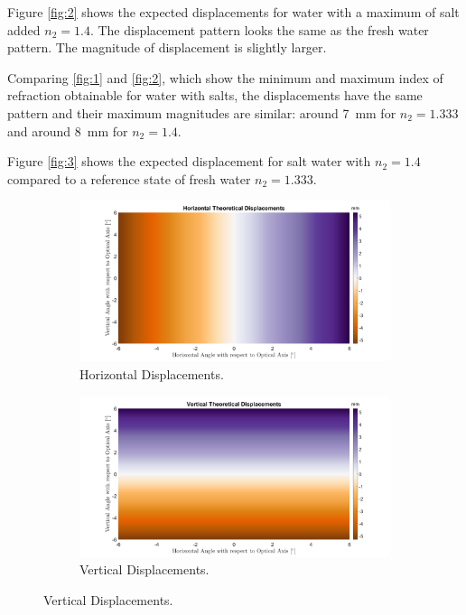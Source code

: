 \documentclass{article}
\begin{document}
Figure \ref{fig:2} shows the expected displacements for water with a maximum of salt added $n_2 = 1.4$. The displacement pattern looks the same as the fresh water pattern. The magnitude of displacement is slightly larger. 

Comparing \ref{fig:1} and \ref{fig:2}, which show the minimum and maximum index of refraction obtainable for water with salts, the displacements have the same pattern and their maximum magnitudes are similar: around \SI{7}{\milli\metre} for $n_2 = 1.333$ and around \SI{8}{\milli\metre} for $n_2 = 1.4$.

Figure \ref{fig:3} shows the expected displacement for salt water with $n_2 = 1.4$ compared to a reference state of fresh water $n_2 = 1.333$. 

\begin{figure}
\begin{subfigure}[b]{.5\linewidth}
\centering \includegraphics[width=\linewidth]{hordispnmin.png}
\caption{Horizontal Displacements.}\label{fig:1a}
\end{subfigure}%
\begin{subfigure}[b]{.5\linewidth}
\centering\large \includegraphics[width=\linewidth]{verdispnmin.png}
\caption{Vertical Displacements.}\label{fig:1b}

\end{subfigure}
\end{figure}
\end{document}
